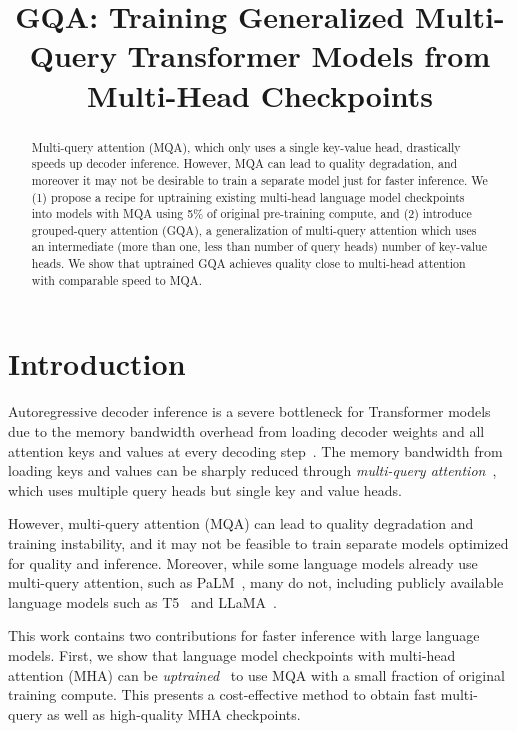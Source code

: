 \title{GQA: Training Generalized Multi-Query Transformer Models from Multi-Head Checkpoints}

\begin{abstract}
Multi-query attention (\textsc{MQA}), which only uses a single key-value head, drastically speeds up decoder inference. However, \textsc{MQA} can lead to quality degradation, and moreover it may not be desirable to train a separate model just for faster inference. We (1) propose a recipe for uptraining existing multi-head language model checkpoints into models with \textsc{MQA} using 5\% of original pre-training compute, and (2) introduce grouped-query attention (\textsc{GQA}), a generalization of multi-query attention which uses an intermediate (more than one, less than number of query heads) number of key-value heads. We show that uptrained \textsc{GQA} achieves quality close to multi-head attention with comparable speed to \textsc{MQA}.
\end{abstract}

\section{Introduction}
\label{section:intro}

Autoregressive decoder inference is a severe bottleneck for Transformer models due to the memory bandwidth overhead from loading decoder weights and all attention keys and values at every decoding step~\citep{shazeer2019mq, palminference, dejong2022fido}. The memory bandwidth from loading keys and values can be sharply reduced through \emph{multi-query attention}~\citep{shazeer2019mq}, which uses multiple query heads but single key and value heads.

However, multi-query attention (\textsc{MQA}) can lead to quality degradation and training instability, and it may not be feasible to train separate models optimized for quality and inference. Moreover, while some language models already use multi-query attention, such as PaLM~\citep{palm}, many do not, including publicly available language models such as T5~\citep{t5} and LLaMA~\citep{llama}. 

This work contains two contributions for faster inference with large language models. First, we show that language model checkpoints with multi-head attention (\textsc{MHA}) can be \emph{uptrained}~\citep{sparsemoe} to use \textsc{MQA} with a small fraction of original training compute. This presents a cost-effective method to obtain fast multi-query as well as high-quality \textsc{MHA} checkpoints.

